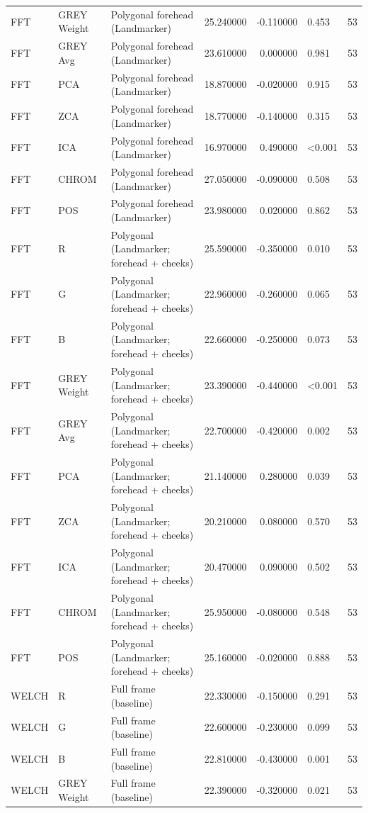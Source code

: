 \begin{table}[htbp]
\begin{tabular}{l l l r r l r}
FFT & GREY Weight & Polygonal forehead (Landmarker) & 25.240000 & -0.110000 & 0.453 & 53 \\
FFT & GREY Avg & Polygonal forehead (Landmarker) & 23.610000 & 0.000000 & 0.981 & 53 \\
FFT & PCA & Polygonal forehead (Landmarker) & 18.870000 & -0.020000 & 0.915 & 53 \\
FFT & ZCA & Polygonal forehead (Landmarker) & 18.770000 & -0.140000 & 0.315 & 53 \\
FFT & ICA & Polygonal forehead (Landmarker) & 16.970000 & 0.490000 & <0.001 & 53 \\
FFT & CHROM & Polygonal forehead (Landmarker) & 27.050000 & -0.090000 & 0.508 & 53 \\
FFT & POS & Polygonal forehead (Landmarker) & 23.980000 & 0.020000 & 0.862 & 53 \\
FFT & R & Polygonal (Landmarker; forehead + cheeks) & 25.590000 & -0.350000 & 0.010 & 53 \\
FFT & G & Polygonal (Landmarker; forehead + cheeks) & 22.960000 & -0.260000 & 0.065 & 53 \\
FFT & B & Polygonal (Landmarker; forehead + cheeks) & 22.660000 & -0.250000 & 0.073 & 53 \\
FFT & GREY Weight & Polygonal (Landmarker; forehead + cheeks) & 23.390000 & -0.440000 & <0.001 & 53 \\
FFT & GREY Avg & Polygonal (Landmarker; forehead + cheeks) & 22.700000 & -0.420000 & 0.002 & 53 \\
FFT & PCA & Polygonal (Landmarker; forehead + cheeks) & 21.140000 & 0.280000 & 0.039 & 53 \\
FFT & ZCA & Polygonal (Landmarker; forehead + cheeks) & 20.210000 & 0.080000 & 0.570 & 53 \\
FFT & ICA & Polygonal (Landmarker; forehead + cheeks) & 20.470000 & 0.090000 & 0.502 & 53 \\
FFT & CHROM & Polygonal (Landmarker; forehead + cheeks) & 25.950000 & -0.080000 & 0.548 & 53 \\
FFT & POS & Polygonal (Landmarker; forehead + cheeks) & 25.160000 & -0.020000 & 0.888 & 53 \\
WELCH & R & Full frame (baseline) & 22.330000 & -0.150000 & 0.291 & 53 \\
WELCH & G & Full frame (baseline) & 22.600000 & -0.230000 & 0.099 & 53 \\
WELCH & B & Full frame (baseline) & 22.810000 & -0.430000 & 0.001 & 53 \\
WELCH & GREY Weight & Full frame (baseline) & 22.390000 & -0.320000 & 0.021 & 53 \\

\end{tabular}
\end{table}
